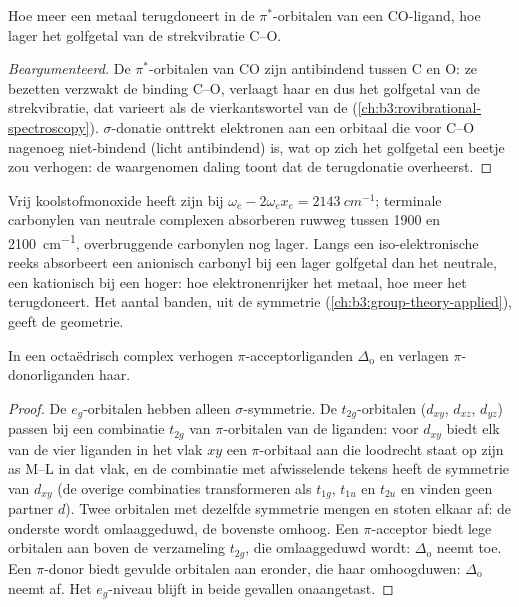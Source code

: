 \begin{proposition}[CO-strekfrequenties]\label{prop:b3:organometallic-bonding:co-frequency}
Hoe meer een metaal terugdoneert in de $\pi^*$-orbitalen van een CO-ligand, hoe lager het
golfgetal van de strekvibratie C--O.
\end{proposition}

\begin{proof}[Beargumenteerd]
De $\pi^*$-orbitalen van CO zijn antibindend tussen C en O: ze bezetten verzwakt de
binding C--O, verlaagt haar  en dus het golfgetal van de
strekvibratie, dat varieert als de vierkantswortel van de  (\cref{ch:b3:rovibrational-spectroscopy}).
$\sigma$-donatie onttrekt elektronen aan een orbitaal die voor C--O
nagenoeg niet-bindend (licht antibindend) is, wat op zich het golfgetal
een beetje zou verhogen: de waargenomen daling toont dat de terugdonatie
overheerst.
\end{proof}

Vrij koolstofmonoxide heeft zijn  bij $\omega_e - 2\omega_ex_e = \qty{2143}{cm^{-1}}$; terminale
carbonylen van neutrale complexen absorberen ruwweg tussen 1900 en \qty{2100}{cm^{-1}},
overbruggende carbonylen nog lager. Langs een iso-elektronische reeks
absorbeert een anionisch carbonyl bij een lager golfgetal dan het
neutrale, een kationisch bij een hoger: hoe elektronenrijker het metaal,
hoe meer het terugdoneert. Het aantal banden, uit de symmetrie
(\cref{ch:b3:group-theory-applied}), geeft de geometrie.

\begin{proposition}\label{prop:b3:organometallic-bonding:pi-delta}
In een octaëdrisch complex verhogen $\pi$-acceptorliganden $\Delta_{\mathrm o}$ en verlagen $\pi$-donorliganden
haar.
\end{proposition}

\begin{proof}
De $e_g$-orbitalen hebben alleen $\sigma$-symmetrie. De $t_{2g}$-orbitalen ($d_{xy}$, $d_{xz}$, $d_{yz}$) passen bij een combinatie $t_{2g}$
van $\pi$-orbitalen van de liganden: voor $d_{xy}$ biedt elk van de vier liganden in het vlak $xy$ een
$\pi$-orbitaal aan die loodrecht staat op zijn as M--L in dat vlak, en de
combinatie met afwisselende tekens heeft de symmetrie van $d_{xy}$ (de overige
combinaties transformeren als $t_{1g}$, $t_{1u}$ en $t_{2u}$ en vinden geen partner $d$). Twee orbitalen met
dezelfde symmetrie mengen en stoten elkaar af: de onderste wordt
omlaaggeduwd, de bovenste omhoog. Een
$\pi$-acceptor biedt lege orbitalen aan boven de verzameling $t_{2g}$, die omlaaggeduwd wordt: $\Delta_{\mathrm o}$
neemt toe. Een $\pi$-donor biedt gevulde orbitalen aan eronder, die haar omhoogduwen: $\Delta_{\mathrm o}$
neemt af. Het $e_g$-niveau blijft in beide gevallen onaangetast.
\end{proof}

